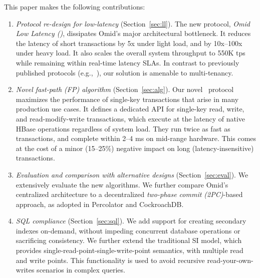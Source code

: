 This paper makes the following contributions: 
\begin{enumerate}
    \setlength{\itemsep}{1pt}
    \setlength{\parskip}{1pt}
    \setlength{\parsep}{1pt}  

\item {\em Protocol re-design for low-latency} (Section~\ref{sec:ll}). 
The new protocol,    \emph{Omid Low Latency (\sysll)}, 
dissipates Omid's major architectural bottleneck. 
It reduces the latency of short transactions by 5x under light load, and 
by 10x--100x under heavy load. %
It also scales 
the overall system throughput to 550K tps while remaining 
within real-time latency SLAs. In contrast to previously published protocols 
(e.g.,~\cite{Percolator2010}), our solution is amenable to multi-tenancy.

\item {\em Novel fast-path (FP) algorithm} (Section~\ref{sec:alg}). 
Our  novel \sys\ protocol  
maximizes the performance of  single-key transactions
that arise in many production use cases. 
It defines a dedicated API for single-key read, 
write, and read-modify-write transactions, which execute at the 
latency of native HBase operations regardless of system load.
They run twice as fast as \sysll\/ transactions, and complete within 2--4 ms on mid-range hardware. 
This comes at the cost of a minor (15--25\%) negative impact on long (latency-insensitive) transactions.  

\item \emph{Evaluation and comparison with alternative designs} (Section~\ref{sec:eval}).
We extensively evaluate the new algorithms. %
We further compare Omid's  centralized architecture  to 
a decentralized \emph{two-phase commit (2PC)}-based approach, as 
 adopted in Percolator and CockroachDB.

\item {\em SQL compliance} (Section~\ref{sec:sql}). 
We add support for creating secondary indexes on-demand, 
without impeding concurrent database operations or sacrificing consistency. 
We further extend the traditional SI model, which provides single-read-point-single-write-point semantics, with multiple read and write points. This functionality is used to avoid recursive read-your-own-writes scenarios in complex queries. 

\end{enumerate}

